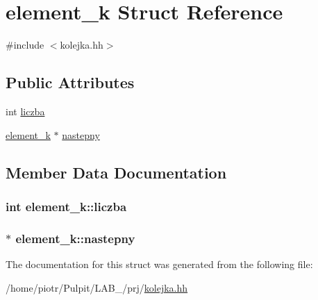 \hypertarget{structelement__k}{\section{element\-\_\-k \-Struct \-Reference}
\label{structelement__k}
}


{\ttfamily \#include $<$kolejka.\-hh$>$}

\subsection*{\-Public \-Attributes}
\begin{DoxyCompactItemize}
\item 
int \hyperlink{structelement__k_a8fb2e537fb971a8b4638e6319e116315}{liczba}
\item 
\hyperlink{structelement__k}{element\-\_\-k} $\ast$ \hyperlink{structelement__k_a7c906a53a5ff3aa1f3423478fc807f4b}{nastepny}
\end{DoxyCompactItemize}


\subsection{\-Member \-Data \-Documentation}
\hypertarget{structelement__k_a8fb2e537fb971a8b4638e6319e116315}{
\subsubsection[{liczba}]{\setlength{\rightskip}{0pt plus 5cm}int {\bf element\-\_\-k\-::liczba}}}\label{structelement__k_a8fb2e537fb971a8b4638e6319e116315}
\hypertarget{structelement__k_a7c906a53a5ff3aa1f3423478fc807f4b}{
\subsubsection[{nastepny}]{$\ast$ {\bf element\-\_\-k\-::nastepny}}}\label{structelement__k_a7c906a53a5ff3aa1f3423478fc807f4b}


\-The documentation for this struct was generated from the following file\-:\begin{DoxyCompactItemize}
\item 
/home/piotr/\-Pulpit/\-L\-A\-B\-\_/prj/\hyperlink{kolejka_8hh}{kolejka.\-hh}\end{DoxyCompactItemize}
